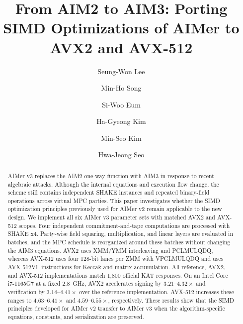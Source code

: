 \title{From AIM2 to AIM3: Porting SIMD Optimizations of AIMer to AVX2 and AVX-512}

\author{Seung-Won Lee \and
Min-Ho Song \and
Si-Woo Eum \and
Ha-Gyeong Kim \and
Min-Seo Kim \and
Hwa-Jeong Seo}

\maketitle

\begin{abstract}
AIMer v3 replaces the AIM2 one-way function with AIM3 in response to recent
algebraic attacks.  Although the internal equations and execution flow change,
the scheme still contains independent SHAKE instances and repeated binary-field
operations across virtual MPC parties.  This paper investigates whether the
SIMD optimization principles previously used for AIMer v2 remain applicable to
the new design.  We implement all six AIMer v3 parameter sets with matched AVX2
and AVX-512 scopes.  Four independent commitment-and-tape computations are
processed with SHAKE x4.  Party-wise field squaring, multiplication, and linear
layers are evaluated in batches, and the MPC schedule is reorganized around
these batches without changing the AIM3 equations.  AVX2 uses XMM/YMM
interleaving and PCLMULQDQ, whereas AVX-512 uses four 128-bit lanes per ZMM with
VPCLMULQDQ and uses AVX-512VL instructions for Keccak and matrix accumulation.
All reference, AVX2, and AVX-512 implementations match 1,800 official KAT
responses.  On an Intel Core i7-1165G7 at a fixed 2.8~GHz, AVX2 accelerates
signing by $3.21$--$4.32\times$ and verification by $3.14$--$4.41\times$ over
the reference implementation.  AVX-512 increases these ranges to
$4.63$--$6.41\times$ and $4.59$--$6.55\times$, respectively.  These results
show that the SIMD principles developed for AIMer v2 transfer to AIMer v3 when
the algorithm-specific equations, constants, and serialization are preserved.

\end{abstract}
